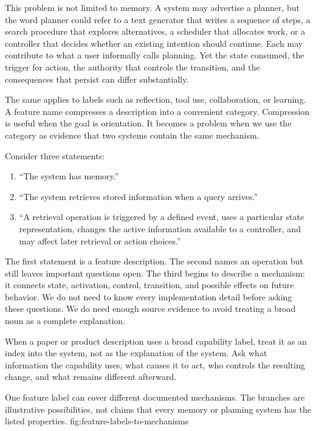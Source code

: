 This problem is not limited to memory. A system may advertise a planner, but the word planner could refer to a text generator that writes a sequence of steps, a search procedure that explores alternatives, a scheduler that allocates work, or a controller that decides whether an existing intention should continue. Each may contribute to what a user informally calls planning. Yet the state consumed, the trigger for action, the authority that controls the transition, and the consequences that persist can differ substantially.

The same applies to labels such as reflection, tool use, collaboration, or learning. A feature name compresses a description into a convenient category. Compression is useful when the goal is orientation. It becomes a problem when we use the category as evidence that two systems contain the same mechanism.

Consider three statements:
\begin{enumerate}
  \item ``The system has memory.''
  \item ``The system retrieves stored information when a query arrives.''
  \item ``A retrieval operation is triggered by a defined event, uses a particular state representation, changes the active information available to a controller, and may affect later retrieval or action choices.''
\end{enumerate}

The first statement is a feature description. The second names an operation but still leaves important questions open. The third begins to describe a mechanism: it connects state, activation, control, transition, and possible effects on future behavior. We do not need to know every implementation detail before asking these questions. We do need enough source evidence to avoid treating a broad noun as a complete explanation.

\begin{tipbox}
When a paper or product description uses a broad capability label, treat it as an index into the system, not as the explanation of the system. Ask what information the capability uses, what causes it to act, who controls the resulting change, and what remains different afterward.
\end{tipbox}

  {One feature label can cover different documented mechanisms. The branches are illustrative possibilities, not claims that every memory or planning system has the listed properties.}
  {fig:feature-labels-to-mechanisms}

